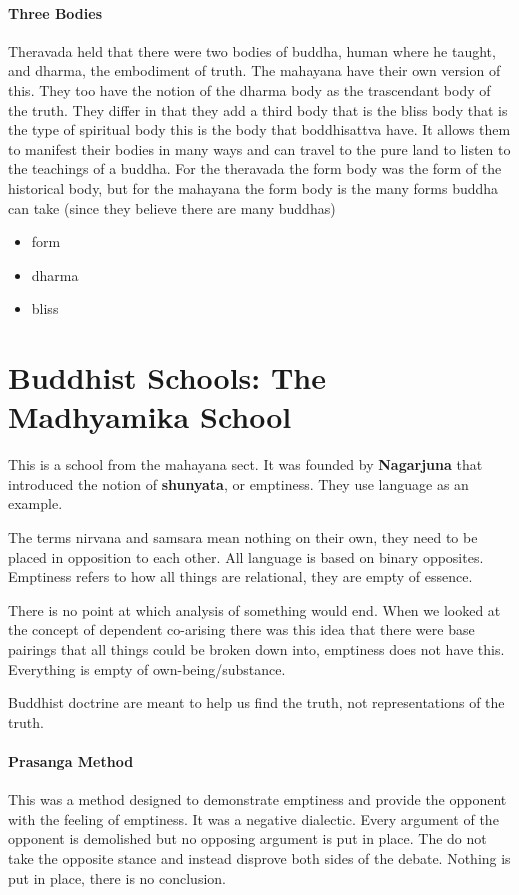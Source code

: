 \documentclass{article}
\begin{document}
\paragraph{Three Bodies}
\label{par:three_bodies}
Theravada held that there were two bodies of buddha, human where he taught, and dharma, the embodiment of truth. The mahayana have their own version of this. They too have the notion of the dharma body as the trascendant body of the truth. They differ in that they add a third body that is the bliss body that is the type of spiritual body this is the body that boddhisattva have. It allows them to manifest their bodies in many ways and can travel to the pure land to listen to the teachings of a buddha. For the theravada the form body was the form of the historical body, but for the mahayana the form body is the many forms buddha can take (since they believe there are many buddhas)

\begin{itemize}
	\item form
	\item dharma
	\item bliss
\end{itemize}


\section*{Buddhist Schools: The Madhyamika School}
\label{sec:the_madhyamika_school}
This is a school from the mahayana sect. It was founded by \textbf{Nagarjuna} that introduced the notion of \textbf{shunyata}, or emptiness. They use language as an example.

The terms nirvana and samsara mean nothing on their own, they need to be placed in opposition to each other. All language is based on binary opposites. Emptiness refers to how all things are relational, they are empty of essence.

There is no point at which analysis of something would end. When we looked at the concept of dependent co-arising there was this idea that there were base pairings that all things could be broken down into, emptiness does not have this. Everything is empty of own-being/substance.

Buddhist doctrine are meant to help us find the truth, not representations of the truth.

\paragraph{Prasanga Method}
\label{par:prasanga_method}
This was a method designed to demonstrate emptiness and provide the opponent with the feeling of emptiness. It was a negative dialectic. Every argument of the opponent is demolished but no opposing argument is put in place. The do not take the opposite stance and instead disprove both sides of the debate. Nothing is put in place, there is no conclusion.
\end{document}
